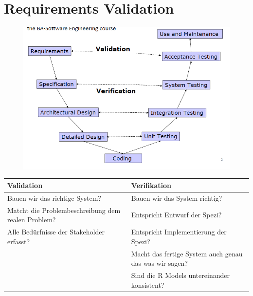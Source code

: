\section{Requirements Validation}
\begin{figure}[!h]
	\centering
	\includegraphics[scale=0.7]{img/v_modell.png}
\end{figure}

\begin{table}[!h]
	\begin{tabular}{|p{20em}|p{20em}|}
		\hline
		\textbf{Validation}	& \textbf{Verifikation}\\
		\hline
		Bauen wir das richtige System? & Bauen wir das System richtig?\\
		\hline
		Matcht die Problembeschreibung dem realen Problem?	& Entspricht Entwurf der Spezi?\\
		\hline
		Alle Bedürfnisse der Stakeholder erfasst? & Entspricht Implementierung der Spezi?\\
		\hline
		& Macht das fertige System auch genau das was wir sagen?\\
		\hline
		& Sind die R Models untereinander konsistent?\\
		\hline
	\end{tabular}
\end{table}

